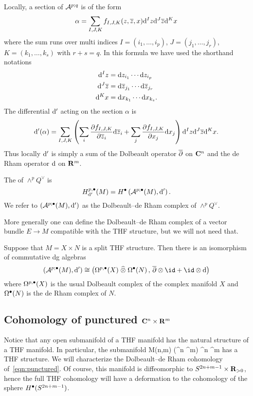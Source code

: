 \documentclass[../main.tex]{subfiles}
\begin{document}
Locally, a section of $\mathcal A^{p;q}$ is of the form
\[
\alpha = \sum_{I,J,K} f_{I,J,K} (z,{\overline{z}}, x) {\rm d}^I z {\rm d}^J {\overline{z}} {\rm d}^K x 
\]
where the sum runs over multi indices $I = (i_1,\ldots,i_p)$, $J = (j_1,\ldots,j_r)$, $K = (k_1,\ldots,k_s)$ with $r + s = q$. 
In this formula we have used the shorthand notations 
\begin{align*}
{\rm d}^I z & = {\rm d} z_{i_1} \cdots {\rm d} z_{i_p} \\ 
{\rm d}^J {\overline{z}} & = {\rm d} {\overline{z}}_{j_1} \cdots {\rm d} {\overline{z}}_{j_r} \\
{\rm d}^K x & = {\rm d} x_{k_1} \cdots {\rm d} x_{k_s} .
\end{align*}
The differential ${\rm d}'$ acting on the section $\alpha$ is 
\[
{\rm d}' (\alpha) = \sum_{I,J,K} \left(\sum_{i} \frac{\partial f_{I,J,K}}{\partial {\overline{z}}_i} {\rm d} {\overline{z}}_i + \sum_{j} \frac{\partial f_{I,J,K}}{\partial x_j} {\rm d} x_j \right) {\rm d}^I z {\rm d}^J {\overline{z}} {\rm d}^K x .
\] 
Thus locally ${\rm d}'$ is simply a sum of the Dolbeault operator $\overline{\partial}$ on $\mathbf{C}^n$ and the de Rham operator ${\rm d}$ on $\mathbf{R}^m$.

\begin{dfn}
The  of $\wedge^p Q^\vee$ is
\[
H^{p,\bullet}_{{\rm d}'} (M) = H^{\bullet} \left(\mathcal A^{p;\bullet}(M), {\rm d}' \right) .
\]
We refer to $(\mathcal A^{p;\bullet}(M), {\rm d}')$ as the Dolbeault--de Rham complex of $\wedge^p Q^\vee$. 
\end{dfn}

More generally one can define the Dolbeault--de Rham complex of a vector bundle $E \to M$ compatible with the THF structure, but we will not need that. 

\parsec
Suppose that $M = X \times N$ is a split THF structure. 
Then there is an isomorphism of commutative dg algebras
\[
\left(\cA^{p;\bu}(M), \d'\right) \cong \left(\Omega^{p,\bu}(X) \hotimes \Omega^\bu(N) \, , \, \dbar \otimes \id + \id \otimes \d\right) 
\]
where $\Omega^{p,\bullet}(X)$ is the usual Dolbeault complex of the complex manifold $X$ and $\Omega^\bullet(N)$ is the de Rham complex of $N$.

\subsection{Cohomology of punctured $\mathbf{C}^n \times \mathbf{R}^m$}

Notice that any open submanifold of a THF manifold has the natural structure of a THF manifold. 
In particular, the submanifold 
\beqn \label{eqn:punctured}
M(n,m)  (\C^n \times \R^m)  \subset \C^n \times \R^m 
\eeqn
has a THF structure.
We will characterize the Dolbeault--de Rham cohomology of~\eqref{eqn:punctured}.
Of course, this manifold is diffeomorphic to $S^{2n+m-1} \times \mathbf{R}_{>0}$, hence the full THF cohomology will have a deformation to the cohomology of the sphere $H^\bullet(S^{2n+m-1})$.
\end{document}
